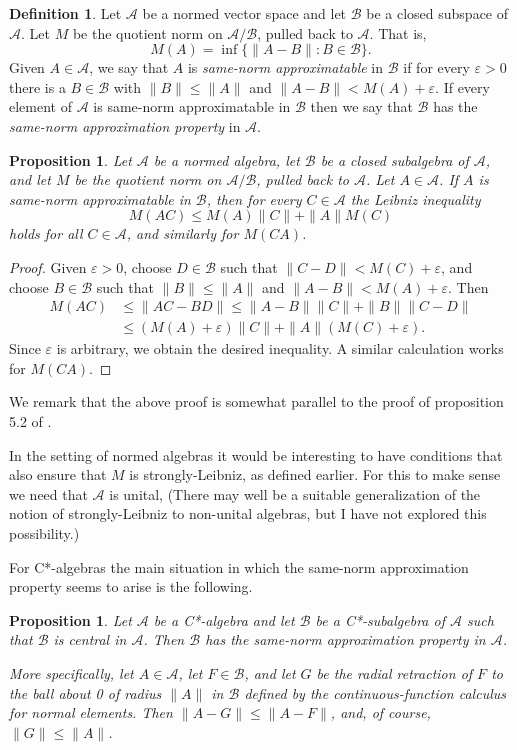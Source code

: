 \documentclass[12pt]{amsart}
\newcommand{\<}{\langle}
\renewcommand{\>}{\rangle}
\newcommand{\e}{\varepsilon}
\newcommand{\cA}{{\mathcal A}}
\newcommand{\cB}{{\mathcal B}}
\newtheorem{proposition}[theorem]{Proposition}
\theoremstyle{definition}   %
\newtheorem{definition}[theorem]{Definition}
\begin{document}
\begin{definition}
\label{samenorm}
Let $\cA$ be a normed vector space and let $\cB$ be a closed subspace
of $\cA$. Let $M$ be the quotient norm on $\cA/ \cB$, pulled back to $\cA$.
That is,
\[
M(A) = \inf \{\|A-B\|: B \in \cB\}  .
\]
Given $A \in \cA$, we say that $A$ is \emph{same-norm approximatable}
in $\cB$ if for every $\e > 0$ there is a $B \in \cB$ with $\|B\| \leq \|A\|$ and
$\|A-B\| < M(A) + \e$. If every element of $\cA$ is same-norm 
approximatable in $\cB$
then we say that $\cB$ has the \emph{same-norm approximation property} in $\cA$.
\end{definition}

\begin{proposition}
 \label{same-leib}
 Let $\cA$ be a normed algebra, let $\cB$ be a closed subalgebra
 of $\cA$, and let $M$ be the quotient norm on $\cA/ \cB$, pulled back to $\cA$.
 Let $A \in \cA$. If $A$ is same-norm approximatable in $\cB$, then for every
 $C \in \cA$ the Leibniz inequality
 \[
 M(AC) \leq M(A)\|C\| +\|A\|M(C)
\]
holds for all $C \in \cA$, and similarly for $M(CA)$. 
  \end{proposition}
  
\begin{proof}
Given $\e > 0$, choose $D \in \cB$ such that $\|C-D\| < M(C) + \e$,
and choose $B\in \cB$ such that $\|B\| \leq \|A\|$ and $\|A-B\| < M(A) + \e$.
Then
\begin{align*}
M(AC) &\leq \|AC - BD\| \leq \|A-B\|\|C\| + \|B\|\|C-D\|   \\
& \leq (M(A) + \e)\|C\| + \|A\|(M(C) + \e).
\end{align*}
Since $\e$ is arbitrary, we obtain the desired inequality.
A similar calculation works for $M(CA)$.
\end{proof}  

We remark that the above proof is somewhat parallel
to the proof of proposition 5.2 of \cite{R21}.

In the setting of normed algebras it would be interesting to 
have conditions that also ensure that $M$ is strongly-Leibniz,
as defined earlier.
For this to make sense we need that $\cA$ is unital, (There
may well be a suitable generalization of the notion of
strongly-Leibniz to non-unital algebras, but I have not
explored this possibility.)

For C*-algebras the main situation in which the same-norm
approximation property seems to arise is the following.

\begin{proposition}
\label{prop-comm}
Let $\cA$ be a C*-algebra and let $\cB$ be a C*-subalgebra
of $\cA$ such that $\cB$ is \emph{central} in $\cA$. Then $\cB$ has
the same-norm approximation property in $\cA$.

More specifically, let $A \in \cA$, let $F \in \cB$, and let $G$ be the
radial retraction of $F$ to the ball about 0 of radius $\|A\|$ in $\cB$
defined by the continuous-function calculus for normal elements. Then 
$\|A-G\| \leq \|A-F\|$, and, of course, $\|G\| \leq \|A\|$.
\end{proposition}
\end{document}
